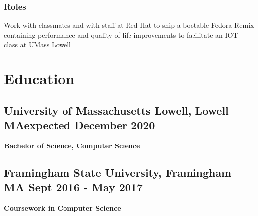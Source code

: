 \documentclass[11pt]{article}
\begin{document}
\subsubsection{Roles}Work with classmates
and with staff at Red Hat
to ship a bootable Fedora Remix containing performance and quality of life improvements
to facilitate an IOT class at UMass Lowell

\section{Education}

\subsection{University of Massachusetts Lowell, Lowell MA\dotfill expected December 2020}
{\hspace{-1em}\bf Bachelor of Science, Computer Science}

\subsection{Framingham State University, Framingham MA
\dotfill Sept 2016 - May 2017} 
{\hspace{-1em}\bf Coursework in Computer Science}

\iffalse
\section{Skills}
\subsection{Software}
\subsubsection{Office} \LaTeX, Excel, Word, PowerPoint, Access
\subsubsection{Project Management} Git
\subsubsection{Operating Systems} 
				Linux, Windows, VxWorks

\subsection{Programming Languages}

\subsubsection{Programming Languages}
C, C++, Java, Python, JavaScript

\subsubsection{Markup Languages}
HTML, R Markdown, Markdown

\fi
\end{document}
